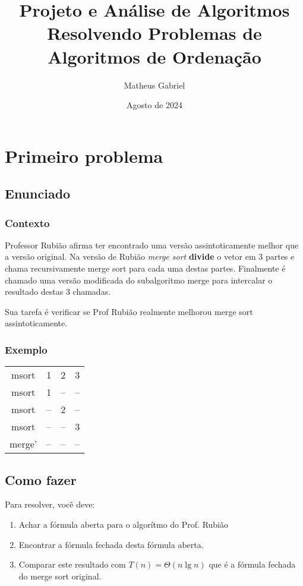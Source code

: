 \documentclass{article}
\title{Projeto e Análise de Algoritmos \\
\large Resolvendo Problemas de Algoritmos de Ordenação}
\author{Matheus Gabriel}
\date{Agosto de 2024}
\begin{document}
\maketitle

\section{Primeiro problema}

\subsection{Enunciado}
\subsubsection{Contexto}
Professor Rubião afirma ter encontrado uma versão assintoticamente melhor que a versão original. Na versão de Rubião \textit{merge sort} \textbf{divide} o vetor em 3 partes e chama recursivamente merge sort para cada uma destas partes. Finalmente é chamado uma versão modificada do subalgoritmo merge para intercalar o resultado destas 3 chamadas.

Sua tarefa é verificar se Prof Rubião realmente melhorou merge sort assintoticamente.

\subsubsection{Exemplo}

\begin{table}[h!]
    \centering
    \begin{tabular}{ c | c | c | c }
        msort & 1 & 2 & 3 \\
        msort & 1 & -- & -- \\
        msort & -- & 2  & -- \\
        msort & -- & -- & 3 \\
        merge' & -- & -- & -- \\


    \end{tabular}
\end{table}

\subsection{Como fazer}
Para resolver, você deve:
\begin{enumerate}
    \item Achar a fórmula aberta para o algorítmo do Prof. Rubião
    \item Encontrar a fórmula fechada desta fórmula aberta.
    \item Comparar este resultado com $T(n) = \Theta (n \lg n)$ que é a fórmula fechada do merge sort original.
\end{enumerate}
\end{document}

